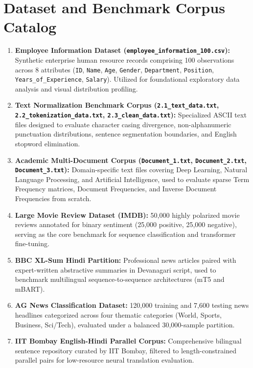 \documentclass[12pt,a4paper]{report}
\begin{document}
\chapter{Dataset and Benchmark Corpus Catalog}
\begin{enumerate}
    \item \textbf{Employee Information Dataset (\texttt{employee\_information\_100.csv}):} Synthetic enterprise human resource records comprising 100 observations across 8 attributes (\texttt{ID}, \texttt{Name}, \texttt{Age}, \texttt{Gender}, \texttt{Department}, \texttt{Position}, \texttt{Years\_of\_Experience}, \texttt{Salary}). Utilized for foundational exploratory data analysis and visual distribution profiling.
    \item \textbf{Text Normalization Benchmark Corpus (\texttt{2.1\_text\_data.txt}, \texttt{2.2\_tokenization\_data.txt}, \texttt{2.3\_clean\_data.txt}):} Specialized ASCII text files designed to evaluate character casing divergence, non-alphanumeric punctuation distributions, sentence segmentation boundaries, and English stopword elimination.
    \item \textbf{Academic Multi-Document Corpus (\texttt{Document\_1.txt}, \texttt{Document\_2.txt}, \texttt{Document\_3.txt}):} Domain-specific text files covering Deep Learning, Natural Language Processing, and Artificial Intelligence, used to evaluate sparse Term Frequency matrices, Document Frequencies, and Inverse Document Frequencies from scratch.
    \item \textbf{Large Movie Review Dataset (IMDB):} 50,000 highly polarized movie reviews annotated for binary sentiment (25,000 positive, 25,000 negative), serving as the core benchmark for sequence classification and transformer fine-tuning.
    \item \textbf{BBC XL-Sum Hindi Partition:} Professional news articles paired with expert-written abstractive summaries in Devanagari script, used to benchmark multilingual sequence-to-sequence architectures (mT5 and mBART).
    \item \textbf{AG News Classification Dataset:} 120,000 training and 7,600 testing news headlines categorized across four thematic categories (World, Sports, Business, Sci/Tech), evaluated under a balanced 30,000-sample partition.
    \item \textbf{IIT Bombay English-Hindi Parallel Corpus:} Comprehensive bilingual sentence repository curated by IIT Bombay, filtered to length-constrained parallel pairs for low-resource neural translation evaluation.
\end{enumerate}
\end{document}
